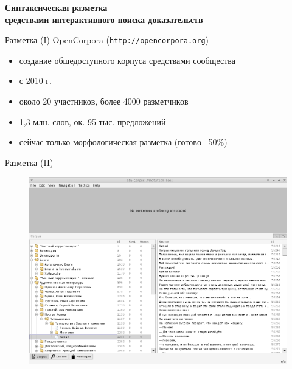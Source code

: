 \documentclass{beamer}
\begin{document}
\begin{frame}{}
\begin{center}
	\textbf{Синтаксическая разметка\\средствами интерактивного поиска доказательств}
\end{center}
\end{frame}

\begin{frame}{Разметка (I)}
OpenCorpora (\texttt{http://opencorpora.org})\\
\bigskip
\begin{itemize}
    \item создание общедоступного корпуса средствами сообщества
    \item с 2010 г.
    \item около 20 участников, более 4000 разметчиков
    \item 1,3 млн. слов, ок. 95 тыс. предложений
    \item сейчас только морфологическая разметка (готово ~50\%)
\end{itemize}
\end{frame}

\begin{frame}{Разметка (II)}
\begin{center}
	\begin{figure}[H]
		\includegraphics[scale=0.285]{annotation1.png} 
	\end{figure}
\end{center}
\end{frame}
\end{document}
